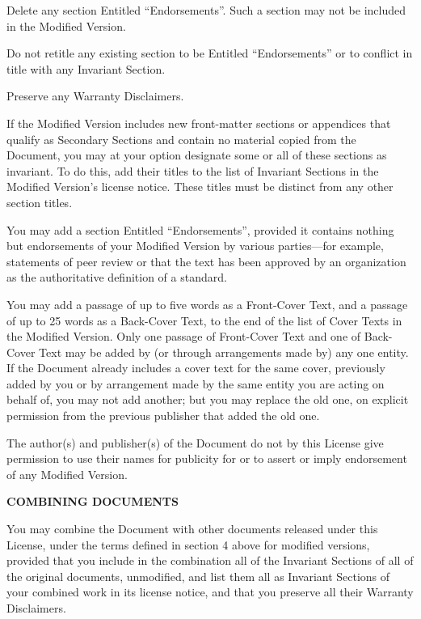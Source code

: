 \item
Delete any section Entitled ``Endorsements''.  Such a section may not be included in the Modified Version.

\item
Do not retitle any existing section to be Entitled ``Endorsements'' or to conflict in title with any Invariant Section.

\item
Preserve any Warranty Disclaimers.
\stopitemize

If the Modified Version includes new front-matter sections or appendices that qualify as Secondary Sections and contain no material copied from the Document, you may at your option designate some or all of these sections as invariant.  To do this, add their titles to the list of Invariant Sections in the Modified Version's license notice. These titles must be distinct from any other section titles.

You may add a section Entitled ``Endorsements'', provided it contains nothing but endorsements of your Modified Version by various parties---for example, statements of peer review or that the text has been approved by an organization as the authoritative definition of a standard.

You may add a passage of up to five words as a Front-Cover Text, and a passage of up to 25 words as a Back-Cover Text, to the end of the list of Cover Texts in the Modified Version.  Only one passage of Front-Cover Text and one of Back-Cover Text may be added by (or through arrangements made by) any one entity.  If the Document already includes a cover text for the same cover, previously added by you or by arrangement made by the same entity you are acting on behalf of, you may not add another; but you may replace the old one, on explicit permission from the previous publisher that added the old one.

The author(s) and publisher(s) of the Document do not by this License give permission to use their names for publicity for or to assert or imply endorsement of any Modified Version.

\item
{\bf COMBINING DOCUMENTS}

You may combine the Document with other documents released under this License, under the terms defined in section 4 above for modified versions, provided that you include in the combination all of the Invariant Sections of all of the original documents, unmodified, and list them all as Invariant Sections of your combined work in its license notice, and that you preserve all their Warranty Disclaimers.


